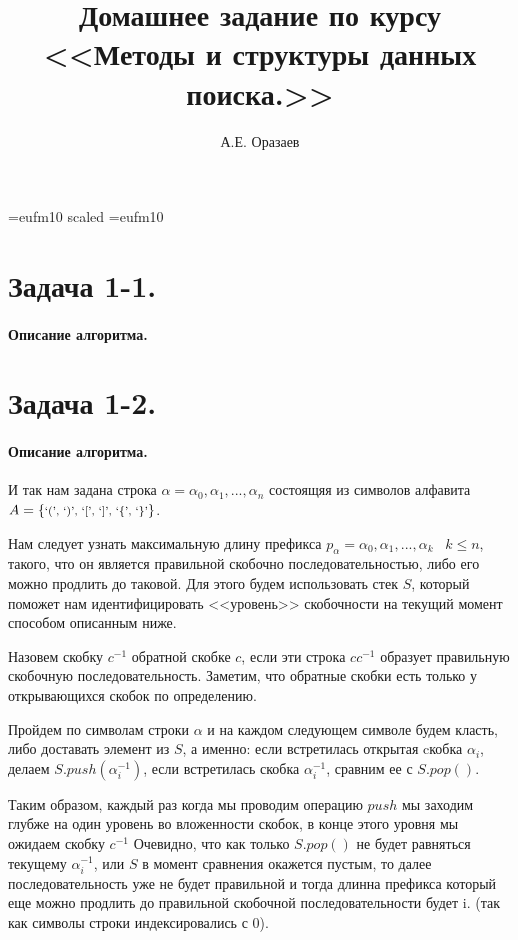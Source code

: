 \documentclass[12pt]{article}
\title{\bf Домашнее задание по курсу \\ <<Методы
и структуры данных поиска.>>}
\author{А.Е. Оразаев}
\date{}
\begin{document}
\voffset=-20mm 
\hoffset=-12mm
\font\Got=eufm10 scaled \font\Got=eufm10

\maketitle

\section{Задача 1-1.}
\paragraph{Описание алгоритма.}





\section{Задача 1-2.} 
\paragraph{Описание алгоритма.}
И так нам задана строка $ \alpha = \alpha_0, \alpha_1, ..., \alpha_n$ состоящяя
из символов алфавита 
$ A = \left\{ 
    \mbox{\footnotesize{`(', `)', `[', `]', `\{', `\}'}}
\right\} $.

Нам следует узнать максимальную длину префикса $ p_{\alpha} = \alpha_0, \alpha_1, ..., \alpha_k \;\;\; k \le n$, такого, что он является
правильной скобочно последовательностью, либо его можно продлить до таковой. Для этого будем использовать стек $ S $,
который поможет нам идентифицировать <<уровень>> скобочности на текущий момент способом
описанным ниже.

Назовем скобку $ c^{-1} $ обратной скобке $ c $, если эти строка $ cc^{-1} $ образует правильную скобочную последовательность.
Заметим, что обратные скобки есть только у открывающихся скобок по определению.

Пройдем по символам строки $ \alpha $ и на каждом следующем символе будем класть, либо доставать элемент из $ S $, а именно:
если встретилась открытая cкобка $ \alpha_i $, делаем $ S.push(\alpha_i^{-1}) $, если встретилась скобка $\alpha_i^{-1}$, сравним ее 
с $ S.pop() $.

Таким образом, каждый раз когда мы проводим операцию $ push $ мы заходим глубже на один уровень во вложенности скобок, в
конце этого уровня мы ожидаем скобку $ c^{-1} $
Очевидно, что как только $ S.pop() $ не будет равняться текущему $ \alpha_i^{-1} $, или $ S $ в момент сравнения окажется пустым, 
то далее последовательность уже не будет правильной и тогда длинна префикса который еще можно продлить до правильной скобочной 
последовательности будет i. (так как символы строки индексировались с 0).
\end{document}
